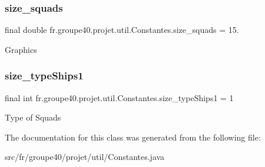 \subsubsection{\texorpdfstring{size\+\_\+squads}{size\_squads}}
{\footnotesize\ttfamily final double fr.\+groupe40.\+projet.\+util.\+Constantes.\+size\+\_\+squads = 15.\hspace{0.3cm}{\ttfamily [static]}}

Graphics \mbox{\label{classfr_1_1groupe40_1_1projet_1_1util_1_1_constantes_aae58c6abfb1e6f953eb91a86b61db339}} 
\subsubsection{\texorpdfstring{size\+\_\+type\+Ships1}{size\_typeShips1}}
{\footnotesize\ttfamily final int fr.\+groupe40.\+projet.\+util.\+Constantes.\+size\+\_\+type\+Ships1 = 1\hspace{0.3cm}{\ttfamily [static]}}

Type of Squads 

The documentation for this class was generated from the following file\+:\begin{DoxyCompactItemize}
\item 
src/fr/groupe40/projet/util/Constantes.\+java\end{DoxyCompactItemize}
